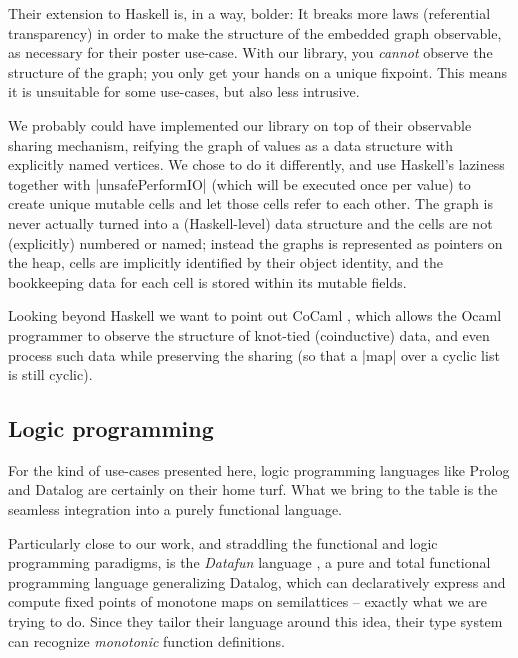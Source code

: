 \documentclass[manuscript,anonymous,screen,acmsmall]{acmart}
\begin{document}
Their extension to Haskell is, in a way, bolder: It breaks more laws (referential transparency) in order to make the structure of the embedded graph observable, as necessary for their poster use-case. With our library, you \emph{cannot} observe the structure of the graph; you only get your hands on a unique fixpoint. This means it is unsuitable for some use-cases, but also less intrusive.

We probably could have implemented our library on top of their observable sharing mechanism, reifying the graph of values as a data structure with explicitly named vertices. We chose to do it differently, and use Haskell's laziness together with |unsafePerformIO| (which will be executed once per value) to create unique mutable cells and let those cells refer to each other. The graph is never actually turned into a (Haskell-level) data structure and the cells are not (explicitly) numbered or named; instead the graphs is represented as pointers on the heap, cells are implicitly identified by their object identity, and the bookkeeping data for each cell is stored within its mutable fields.

Looking beyond Haskell we want to point out CoCaml \citep{cocaml}, which allows the Ocaml programmer to observe the structure of knot-tied (coinductive) data, and even process such data while preserving the sharing (so that a |map| over a cyclic list is still cyclic).


\subsection{Logic programming}

For the kind of use-cases presented here, logic programming languages like Prolog and Datalog are certainly on their home turf. What we bring to the table is the seamless integration into a purely functional language.

Particularly close to our work, and straddling the functional and logic programming paradigms, is the \emph{Datafun} language \citep{datafun}, a pure and total functional programming language generalizing Datalog, which can declaratively express and compute fixed points of monotone maps on semilattices -- exactly what we are trying to do. Since they tailor their language around this idea, their type system can recognize \emph{monotonic} function definitions.
\end{document}
